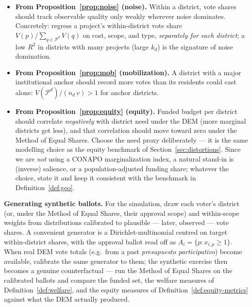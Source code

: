 \documentclass[11pt,letterpaper]{article}
\theoremstyle{definition}
\theoremstyle{plain}
\theoremstyle{remark}
\newcommand{\Pset}{\mathcal{P}}
\newcommand{\votes}{v}
\begin{document}
\begin{itemize}[nosep]
  \item \textbf{From Proposition~\ref{prop:noise} (noise).} Within a district, vote shares should track
        observable quality only weakly wherever noise dominates. Concretely: regress a project's
        within-district vote share $V(p)/\sum_{q\in\Pset^d}V(q)$ on cost, scope, and type,
        \emph{separately for each district}; a low $R^2$ in districts with many projects (large $k_d$)
        is the signature of noise domination.
  \item \textbf{From Proposition~\ref{prop:mob} (mobilization).} A district with a major institutional
        anchor should record more votes than its residents could cast alone:
        $V(\Pset^d)/(n_d\,\votes)>1$ for anchor districts.
  \item \textbf{From Proposition~\ref{prop:equity} (equity).} Funded budget per district should
        correlate \emph{negatively} with district need under the DEM (more marginal districts get less),
        and that correlation should move toward zero under the Method of Equal Shares. Choose the need
        proxy deliberately --- it is the same modelling choice as the equity benchmark of
        Section~\ref{sec:distortions}. Since we are \emph{not} using a CONAPO marginalization index, a
        natural stand-in is (inverse) salience, or a population-adjusted funding share; whatever the
        choice, state it and keep it consistent with the benchmark in Definition~\ref{def:geo}.
\end{itemize}

\begin{aside}\small
\textbf{Generating synthetic ballots.} For the simulation, draw each voter's district (or, under the
Method of Equal Shares, their approval scope) and within-scope weights from distributions calibrated to
plausible --- later, observed --- vote shares. A convenient generator is a Dirichlet-multinomial centred
on target within-district shares, with the approval ballot read off as $A_i=\{p:x_{i,p}\ge1\}$. When
real DEM vote totals (e.g.\ from a past \emph{presupuesto participativo}) become available, calibrate
the same generator to them; the synthetic exercise then becomes a genuine counterfactual --- run the
Method of Equal Shares on the calibrated ballots and compare the funded set, the welfare measures of
Definition~\ref{def:welfare}, and the equity measures of Definition~\ref{def:equity-metrics} against
what the DEM actually produced.
\end{aside}
\end{document}
